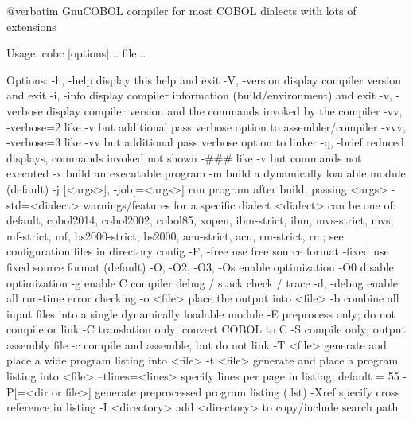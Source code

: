 @verbatim
GnuCOBOL compiler for most COBOL dialects with lots of extensions

Usage: cobc [options]... file...

Options:
  -h, -help             display this help and exit
  -V, -version          display compiler version and exit
  -i, -info             display compiler information (build/environment)
                        and exit
  -v, -verbose          display compiler version and the commands
                        invoked by the compiler
  -vv, -verbose=2       like -v but additional pass verbose option
                        to assembler/compiler
  -vvv, -verbose=3      like -vv but additional pass verbose option
                        to linker
  -q, -brief            reduced displays, commands invoked not shown
  -###                  like -v but commands not executed
  -x                    build an executable program
  -m                    build a dynamically loadable module (default)
  -j [<args>], -job[=<args>]	run program after build, passing <args>
  -std=<dialect>        warnings/features for a specific dialect
                        <dialect> can be one of:
                        default, cobol2014, cobol2002, cobol85, xopen,
                        ibm-strict, ibm, mvs-strict, mvs,
                        mf-strict, mf, bs2000-strict, bs2000,
                        acu-strict, acu, rm-strict, rm;
                        see configuration files in directory config
  -F, -free             use free source format
  -fixed                use fixed source format (default)
  -O, -O2, -O3, -Os     enable optimization
  -O0                   disable optimization
  -g                    enable C compiler debug / stack check / trace
  -d, -debug            enable all run-time error checking
  -o <file>             place the output into <file>
  -b                    combine all input files into a single
                        dynamically loadable module
  -E                    preprocess only; do not compile or link
  -C                    translation only; convert COBOL to C
  -S                    compile only; output assembly file
  -c                    compile and assemble, but do not link
  -T <file>             generate and place a wide program listing into <file>
  -t <file>             generate and place a program listing into <file>
  --tlines=<lines>      specify lines per page in listing, default = 55
  -P[=<dir or file>]    generate preprocessed program listing (.lst)
  -Xref                 specify cross reference in listing
  -I <directory>        add <directory> to copy/include search path
